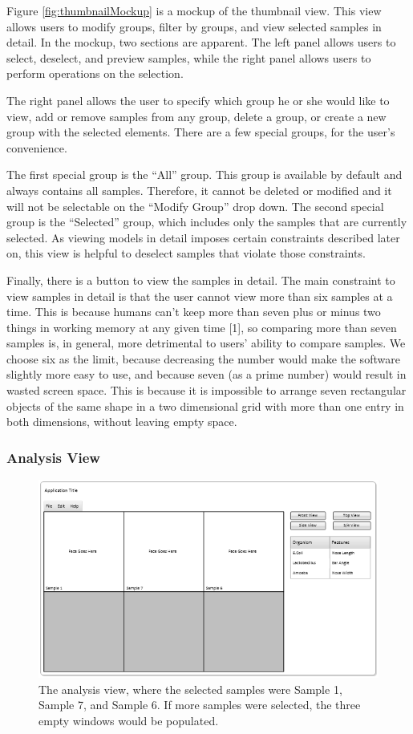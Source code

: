 \documentclass[letterpaper,10pt, onecolumn, draftclsnofoot]{IEEEtran}
\begin{document}
Figure \ref{fig:thumbnailMockup} is a mockup of the thumbnail view. This view allows users to modify groups, filter by groups, and view selected samples in detail. In the mockup, two sections are apparent. The left panel allows users to select, deselect, and preview samples, while the right panel allows users to perform operations on the selection.

The right panel allows the user to specify which group he or she would like to view, add or remove samples from any group, delete a group, or create a new group with the selected elements. There are a few special groups, for the user's convenience. 

The first special group is the ``All'' group. This group is available by default and always contains all samples. Therefore, it cannot be deleted or modified and it will not be selectable on the ``Modify Group'' drop down. The second special group is the ``Selected'' group, which includes only the samples that are currently selected. As viewing models in detail imposes certain constraints described later on, this view is helpful to deselect samples that violate those constraints.

Finally, there is a button to view the samples in detail. The main constraint to view samples in detail is that the user cannot view more than six samples at a time. This is because humans can't keep more than seven plus or minus two things in working memory at any given time [1], so comparing more than seven samples is, in general, more detrimental to users' ability to compare samples. We choose six as the limit, because decreasing the number would make the software slightly more easy to use, and because seven (as a prime number) would result in wasted screen space. This is because it is impossible to arrange seven rectangular objects of the same shape in a two dimensional grid with more than one entry in both dimensions, without leaving empty space.

\subsubsection{Analysis View}
\begin{figure}[h]
	\includegraphics[width=\textwidth]{analysisMenu.PNG}
	\caption{The analysis view, where the selected samples were Sample 1, Sample 7, and Sample 6. If more samples were selected, the three empty windows would be populated.}
	\label{fig:analysisMockup}
\end{figure}
\end{document}
